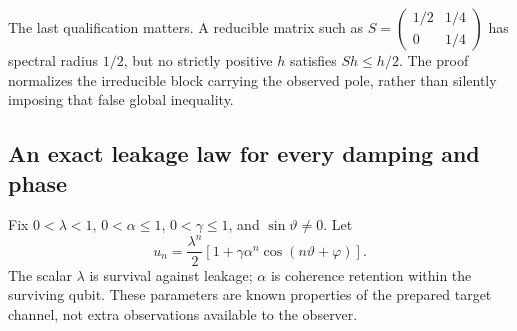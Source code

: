 The last qualification matters. A reducible matrix such as
$S=\left(\begin{smallmatrix}1/2&1/4\\0&1/4\end{smallmatrix}\right)$
has spectral radius $1/2$, but no strictly positive $h$ satisfies $Sh\le h/2$. The proof normalizes the irreducible block carrying the observed pole, rather than silently imposing that false global inequality.

\subsection{An exact leakage law for every damping and phase}
Fix $0<\lambda<1$, $0<\alpha\le1$, $0<\gamma\le1$, and $\sin\vartheta\ne0$. Let
\begin{equation}\label{eq:r70-leaky-response}
 u_n=\frac{\lambda^n}{2}
       [1+\gamma\alpha^n\cos(n\vartheta+\varphi)].
\end{equation}
The scalar $\lambda$ is survival against leakage; $\alpha$ is coherence retention within the surviving qubit. These parameters are known properties of the prepared target channel, not extra observations available to the observer.

